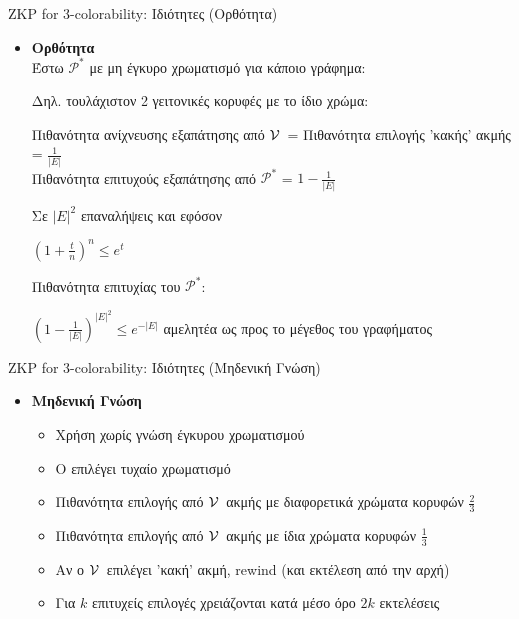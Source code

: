 \documentclass[10pt,handout]{beamer}
\begin{document}
\begin{frame}{ZKP for 3-colorability: Ιδιότητες (Ορθότητα)} 
\begin{itemize}
\item \textbf{Ορθότητα}\\
Έστω $\mathcal{P}^*$ με μη έγκυρο χρωματισμό για κάποιο γράφημα:

Δηλ. \alert{τουλάχιστον 2 γειτονικές κορυφές με το ίδιο χρώμα}:
\pause

Πιθανότητα ανίχνευσης εξαπάτησης από $\mathcal{V}\,$ = Πιθανότητα επιλογής 'κακής' ακμής = $\frac{1}{|E|}$  \\

Πιθανότητα επιτυχούς εξαπάτησης από $\mathcal{P}^*$ = $1-\frac{1}{|E|}$
\pause

Σε $|E|^2$ επαναλήψεις \pause και εφόσον
\begin{center}
$(1+\frac{t}{n})^n \leq e^t$
\end{center}
\pause
\medskip
Πιθανότητα επιτυχίας του  $\mathcal{P}^*$:

\begin{center}
$(1-\frac{1}{|E|})^{|E|^2} \leq e^{-|E|}$ \pause \alert{αμελητέα} ως προς το μέγεθος του γραφήματος
\end{center}

\end{itemize}
\end{frame}

\begin{frame}{ZKP for 3-colorability: Ιδιότητες (Μηδενική Γνώση)} 
\begin{itemize}
\item \textbf{Μηδενική Γνώση} 
\begin{itemize}
\item Χρήση \siml χωρίς γνώση έγκυρου χρωματισμού \pause
\item Ο \siml  επιλέγει τυχαίο χρωματισμό \pause
\item Πιθανότητα επιλογής από $\mathcal{V}\,$  ακμής με διαφορετικά χρώματα κορυφών $\frac{2}{3}$ \pause
\item Πιθανότητα επιλογής από $\mathcal{V}\,$  ακμής με ίδια χρώματα κορυφών  $\frac{1}{3}$ \pause
\item Αν ο $\mathcal{V}\,$  επιλέγει 'κακή' ακμή, rewind (και εκτέλεση από την αρχή) \pause

\item Για $k$ επιτυχείς επιλογές χρειάζονται κατά μέσο όρο $2k$ εκτελέσεις

\end{itemize}
\end{itemize}
\end{frame}
\end{document}

